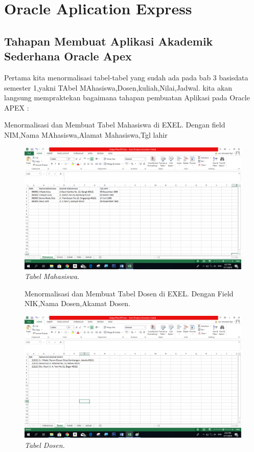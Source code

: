 \chapter{Oracle Aplication Express}

\section{Tahapan Membuat Aplikasi Akademik Sederhana Oracle Apex}
Pertama kita menormalisasi tabel-tabel yang sudah ada pada bab 3 basisdata semester 1,yakni TAbel MAhasiswa,Dosen,kuliah,Nilai,Jadwal. kita akan langsung mempraktekan bagaimana tahapan pembuatan Aplikasi pada Oracle APEX :

\begin{enumerate}
\item[1]Menormalisasi dan Membuat Tabel Mahasiswa di EXEL. Dengan field NIM,Nama MAhasiswa,Alamat Mahasiswa,Tgl lahir

\begin{figure}[!htbp]
    \begin{center}
    \includegraphics[scale=0.5]{figures/1.png}
    \caption{\textit{Tabel Mahasiswa.}}
    \end{center}   
    \end{figure}

\begin{figure}
\item[2]Menormalisasi dan Membuat Tabel Dosen di EXEL. Dengan Field NIK,Nama Dosen,Akamat Dosen.

    \begin{center}
    \includegraphics[scale=0.5]{figures/2.png}
    \caption{\textit{Tabel Dosen.}}
    \end{center}
    \label{gambar}
    \end{figure}


\end{enumerate}
